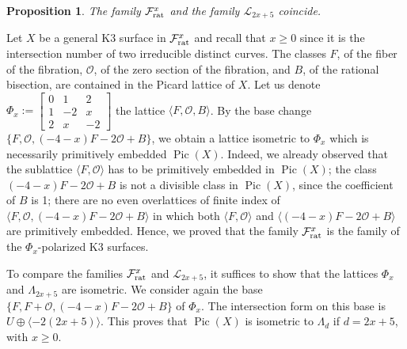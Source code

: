\documentclass{amsart}
\newtheorem{proposition}[theorem]{Proposition}
\theoremstyle{definition}
\numberwithin{equation}{section}
\DeclareMathOperator{\Pic}{Pic}
\begin{document}
\begin{proposition}\label{prop:polarization rational}
The family $\mathcal{F}_{\rm{rat}}^x$ and the family $\mathcal{L}_{2x+5}$ coincide.
\end{proposition}	
\proof Let $X$ be a general K3 surface in $\mathcal{F}_{\rm{rat}}^x$ and recall that $x\geq 0$ since it is the intersection number of two irreducible distinct curves. The classes $F$, of the fiber of the fibration, $\mathcal{O}$, of the zero section of the fibration, and $B$, of the rational bisection, are contained in the Picard lattice of $X$. Let us denote $\Phi_x:=\left[\begin{array}{rrr}0&1&2\\1&-2&x\\2&x&-2\end{array}\right]$ the lattice $\langle F,\mathcal{O},B\rangle$. 
By the base change $\{F,\mathcal{O}, (-4-x)F-2\mathcal{O}+B\}$, we obtain a lattice isometric to $\Phi_x$ which is necessarily primitively embedded $\Pic(X)$. Indeed, we already observed that the sublattice $\langle F,\mathcal{O}\rangle$ has to be primitively embedded in $\Pic(X)$; the class $(-4-x)F-2\mathcal{O}+B$ is not a divisible class in $\Pic(X)$, since the coefficient of $B$ is 1; there are no even overlattices of finite index of $\langle F,\mathcal{O}, (-4-x)F-2\mathcal{O}+B\rangle$ in which both $\langle F,\mathcal{O}\rangle$ and $\langle (-4-x)F-2\mathcal{O}+B\rangle$ are primitively embedded. Hence, we proved that the family $\mathcal{F}_{\rm{rat}}^x$ is the family of the $\Phi_x$-polarized K3 surfaces. 

To compare the families $\mathcal{F}_{\rm{rat}}^x$ and $\mathcal{L}_{2x+5}$, it suffices to show that the lattices $\Phi_x$ and $\Lambda_{2x+5}$ are isometric.  
We consider again the base $\{F, F+\mathcal{O}, (-4-x)F-2\mathcal{O}+B\}$ of $\Phi_x$. The intersection form on this base is $U\oplus \langle -2(2x+5)\rangle$. This proves that $\Pic(X)$ is isometric to $\Lambda_{d}$ if $d=2x+5$, with $x\geq 0$.\endproof
\end{document}

